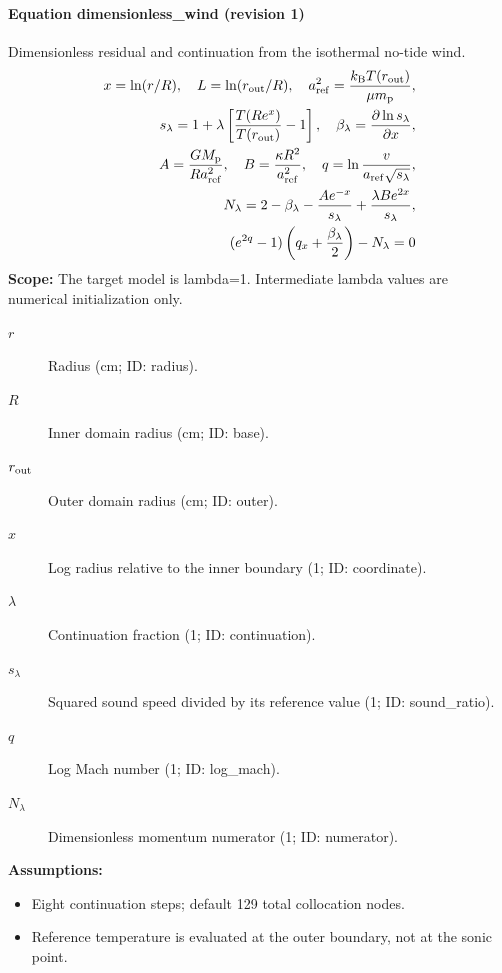 \paragraph{Equation dimensionless\_wind (revision 1)}
Dimensionless residual and continuation from the isothermal no-tide wind.
\begin{equation}
\begin{aligned}
x=\ln(r/R),\quad L=\ln(r_{\rm out}/R),\quad a_{\rm ref}^2=\frac{k_{\rm B}T(r_{\rm out})}{\mu m_{\rm p}},\\
s_\lambda=1+\lambda\left[\frac{T(Re^x)}{T(r_{\rm out})}-1\right],\quad \beta_\lambda=\frac{\partial\ln s_\lambda}{\partial x},\\
A=\frac{GM_{\rm p}}{Ra_{\rm ref}^2},\quad B=\frac{\kappa R^2}{a_{\rm ref}^2},\quad q=\ln\frac{v}{a_{\rm ref}\sqrt{s_\lambda}},\\
N_\lambda=2-\beta_\lambda-\frac{Ae^{-x}}{s_\lambda}+\frac{\lambda Be^{2x}}{s_\lambda},\\
(e^{2q}-1)\left(q_x+\frac{\beta_\lambda}{2}\right)-N_\lambda=0
\end{aligned}
\label{eq:escape.parker_5f_wind:dimensionless_5f_wind:1}
\end{equation}
\noindent\textbf{Scope:} The target model is lambda=1. Intermediate lambda values are numerical initialization only.

\begin{description}
\item[$r$] Radius (cm; ID: radius).
\item[$R$] Inner domain radius (cm; ID: base).
\item[$r_{\rm out}$] Outer domain radius (cm; ID: outer).
\item[$x$] Log radius relative to the inner boundary (1; ID: coordinate).
\item[$\lambda$] Continuation fraction (1; ID: continuation).
\item[$s_\lambda$] Squared sound speed divided by its reference value (1; ID: sound\_ratio).
\item[$q$] Log Mach number (1; ID: log\_mach).
\item[$N_\lambda$] Dimensionless momentum numerator (1; ID: numerator).
\end{description}

\noindent\textbf{Assumptions:}
\begin{itemize}
\item Eight continuation steps; default 129 total collocation nodes.
\item Reference temperature is evaluated at the outer boundary, not at the sonic point.
\end{itemize}

